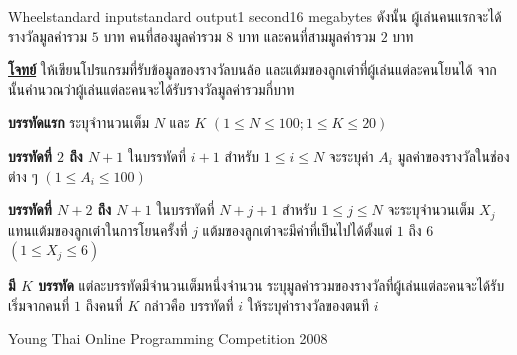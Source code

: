 \documentclass[11pt,a4paper]{article}
\begin{document}
\begin{problem}{Wheel}{standard input}{standard output}{1 second}{16 megabytes}
ดังนั้น ผู้เล่นคนแรกจะได้รางวัลมูลค่ารวม $5$ บาท คนที่สองมูลค่ารวม $8$ บาท และคนที่สามมูลค่ารวม $2$ บาท

\bigskip
\underline{\textbf{โจทย์}}  ให้เขียนโปรแกรมที่รับข้อมูลของรางวัลบนล้อ และแต้มของลูกเต๋าที่ผู้เล่นแต่ละคนโยนได้ จากนั้นคำนวณว่าผู้เล่นแต่ละคนจะได้รับรางวัลมูลค่ารวมกี่บาท

\InputFile

\textbf{บรรทัดแรก} ระบุจำานวนเต็ม $N$ และ $K$ $(1 \leq N \leq 100; 1 \leq K \leq 20)$

\textbf{บรรทัดที่ $2$ ถึง $N+1$} ในบรรทัดที่ $i + 1$ สำหรับ $1 \leq i \leq N$ จะระบุค่า $A_i$ มูลค่าของรางวัลในช่องต่าง ๆ $(1 \leq A_i \leq 100)$ 

\textbf{บรรทัดที่ $N+2$ ถึง $N+1$} ในบรรทัดที่ $N + j +1$ สำหรับ $1 \leq j \leq N$ จะระบุจำนวนเต็ม $X_j$ แทนแต้มของลูกเต๋าในการโยนครั้งที่ $j$ แต้มของลูกเต๋าจะมีค่าที่เป็นไปได้ตั้งแต่ $1$ ถึง $6$ $(1 \leq X_j \leq 6)$

\OutputFile

\textbf{มี $K$ บรรทัด} แต่ละบรรทัดมีจำนวนเต็มหนึ่งจำนวน ระบุมูลค่ารวมของรางวัลที่ผู้เล่นแต่ละคนจะได้รับ เริ่มจากคนที่ $1$ ถึงคนที่ $K$ กล่าวคือ บรรทัดที่ $i$ ให้ระบุค่ารางวัลของตนที $i$

\Examples

\begin{example}
%
\end{example}


\Source

Young Thai Online Programming Competition 2008

\end{problem}
\end{document}
